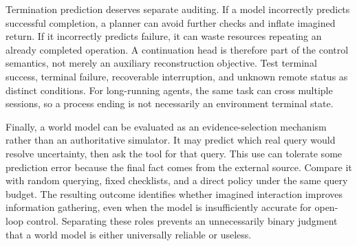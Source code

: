 Termination prediction deserves separate auditing. If a model incorrectly predicts successful completion, a planner can avoid further checks and inflate imagined return. If it incorrectly predicts failure, it can waste resources repeating an already completed operation. A continuation head is therefore part of the control semantics, not merely an auxiliary reconstruction objective. Test terminal success, terminal failure, recoverable interruption, and unknown remote status as distinct conditions. For long-running agents, the same task can cross multiple sessions, so a process ending is not necessarily an environment terminal state.

Finally, a world model can be evaluated as an evidence-selection mechanism rather than an authoritative simulator. It may predict which real query would resolve uncertainty, then ask the tool for that query. This use can tolerate some prediction error because the final fact comes from the external source. Compare it with random querying, fixed checklists, and a direct policy under the same query budget. The resulting outcome identifies whether imagined interaction improves information gathering, even when the model is insufficiently accurate for open-loop control. Separating these roles prevents an unnecessarily binary judgment that a world model is either universally reliable or useless.

